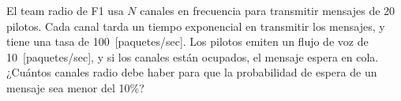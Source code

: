 \documentclass{upmassignment}
\begin{document}
\begin{problemlist}
    \pbitem El team radio de F1
    usa $N$ canales en frecuencia para
    transmitir mensajes de 20 pilotos.
    Cada canal tarda un tiempo exponencial
    en transmitir los mensajes, y tiene
    una tasa de 100~[paquetes/sec].
    Los pilotos emiten un flujo de voz de
    10~[paquetes/sec], y si los canales 
    están ocupados, el mensaje espera en cola.
    ¿Cuántos canales radio debe haber para
    que la probabilidad de espera de un
    mensaje sea menor del 10\%?

    \begin{minipage}{\textwidth}
        \centering
        \resizebox{!}{.27\textwidth}{%
            
        }
    \end{minipage}

    \begin{solucion}
        
    \end{solucion}
\end{problemlist}
\end{document}
